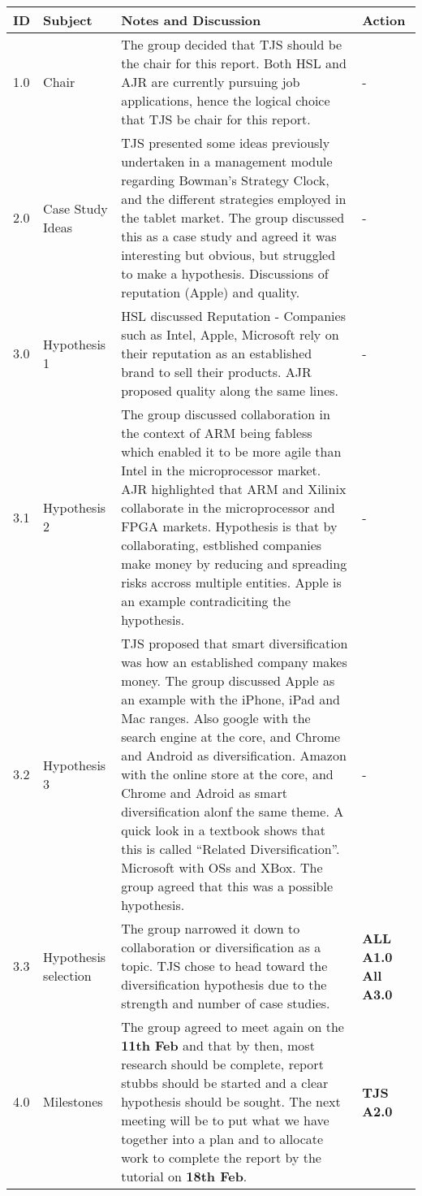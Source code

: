 \documentclass{elec6049Report}     %
\begin{document}
\begin{center}
\begin{longtable}{| p{} |>{\raggedright\arraybackslash}p{} | p{} |>{\raggedright\arraybackslash}p{}|} \hline
\textbf{ID} & \textbf{Subject} & \textbf{Notes and Discussion} & \textbf{Action} \\ \hline
\endhead
1.0	&	Chair	&	The group decided that TJS should be the chair for this report. Both HSL and AJR are currently pursuing job applications, hence the logical choice that TJS be chair for this report. 	&   -	 \\ \hline
2.0	&	Case Study Ideas	&	TJS presented some ideas previously undertaken in a management module regarding Bowman's Strategy Clock, and the different strategies employed in the tablet market. The group discussed this as a case study and agreed it was interesting but obvious, but struggled to make a hypothesis. Discussions of reputation (Apple) and quality.	&-	 \\ \hline
3.0	&	Hypothesis 1	& HSL discussed Reputation - Companies such as Intel, Apple, Microsoft rely on their reputation as an established brand to sell their products. AJR proposed quality along the same lines.  & - \\ \hline
3.1	&	Hypothesis 2	& The group discussed collaboration in the context of ARM being fabless which enabled it to be more agile than Intel in the microprocessor market. AJR highlighted that ARM and Xilinix collaborate in the microprocessor and FPGA markets. Hypothesis is that by collaborating, estblished companies make money by reducing and spreading risks accross multiple entities. Apple is an example contradiciting the hypothesis. &	- \\ \hline
3.2	& Hypothesis 3 & TJS proposed that smart diversification was how an established company makes money. The group discussed Apple as an example with the iPhone, iPad and Mac ranges. Also google with the search engine at the core, and Chrome and Android as diversification. Amazon with the online store at the core, and  Chrome and Adroid as smart diversification alonf the same theme. A quick look in a textbook shows that this is called ``Related Diversification''. Microsoft with OSs and XBox. The group agreed that this was a possible hypothesis. &- \\ \hline
3.3 & Hypothesis selection & The group narrowed it down to collaboration or diversification as a topic. TJS chose to head toward the diversification hypothesis due to the strength and number of case studies. & \textbf{ALL A1.0} \textbf{All A3.0} \\ \hline
4.0 & Milestones & The group agreed to meet again on the \textbf{11th Feb} and that by then, most research should be complete, report stubbs should be started and a clear hypothesis should be sought. The next meeting will be to put what we have together into a plan and to allocate work to complete the report by the tutorial on \textbf{18th Feb}. & \textbf{TJS A2.0} \\ \hline


\end{longtable}
\end{center}
\end{document}
